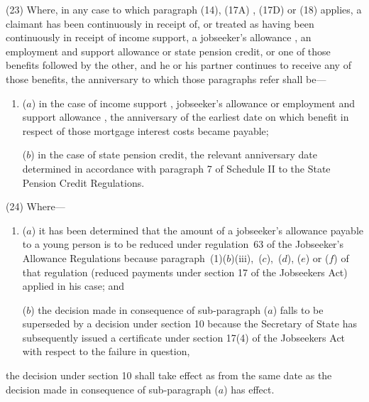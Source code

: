 \documentclass[12pt,a4paper]{article}
\begin{document}
(23) Where, in any case to which paragraph (14), (17A)%
, (17D)  %
or (18) applies, a claimant has been continuously in receipt of, or treated as having been continuously in receipt of income support, a jobseeker’s allowance%
, an employment and support allowance  %
or state pension credit, or one of those benefits followed by the other, and he or his partner continues to receive any of those benefits, the anniversary to which those paragraphs refer shall be—
\begin{enumerate}\item[]
($a$) in the case of income support%
, jobseeker’s allowance or employment and support allowance%
, the anniversary of the earliest date on which benefit in respect of those mortgage interest costs became payable;

($b$) in the case of state pension credit, the relevant anniversary date determined in accordance with paragraph 7 of Schedule II to the State Pension Credit Regulations.
\end{enumerate}

(24) Where—
\begin{enumerate}\item[]
($a$) it has been determined that the amount of a jobseeker’s allowance payable to a young person is to be reduced under regulation~63 of the Jobseeker’s Allowance Regulations because paragraph~(1)($b$)(iii),~($c$),~($d$), ($e$) or ($f$) of that regulation (reduced payments under section 17 of the Jobseekers Act) applied in his case; and

($b$) the decision made in consequence of sub-paragraph ($a$) falls to be superseded by a decision under section 10 because the Secretary of State has subsequently issued a certificate under section 17(4) of the Jobseekers Act with respect to the failure in question,
\end{enumerate}
the decision under section 10 shall take effect as from the same date as the decision made in consequence of sub-paragraph ($a$) has effect.

\end{document}
